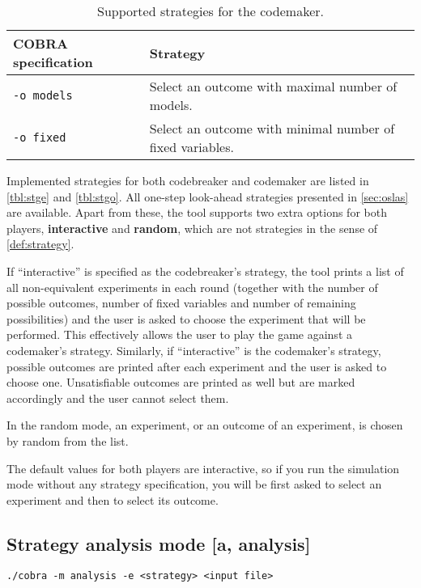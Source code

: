 \begin{table}[h]
\begin{center}
\begin{tabular}{|l|p{7cm}|} \hline
COBRA specification & Strategy \\\hline
 \texttt{-o models} & Select an outcome with maximal number of models. \\
\texttt{-o fixed} & Select an outcome with minimal number of fixed variables. \\\hline
\end{tabular}
\caption{Supported strategies for the codemaker.} \label{tbl:stgo}
\end{center}
\end{table}

Implemented strategies for both codebreaker and codemaker
  are listed in \autoref{tbl:stge} and \autoref{tbl:stgo}.
All one-step look-ahead strategies presented in \autoref{sec:oslas}
  are available.
Apart from these, the tool supports two extra options for both players,
  \textbf{interactive} and \textbf{random},
  which are not strategies in the sense of \autoref{def:strategy}.

If ``interactive'' is specified as the codebreaker's strategy,
  the tool prints a list of all non-equivalent experiments in each round
  (together with the number of possible outcomes, number of fixed variables
  and number of remaining possibilities) and the user is asked
  to choose the experiment that will be performed.
This effectively allows the user to play the game against a codemaker's strategy.
Similarly, if ``interactive'' is the codemaker's strategy, possible outcomes
  are printed after each experiment and the user is asked to choose one.
Unsatisfiable outcomes are printed as well but are marked accordingly
  and the user cannot select them.

In the random mode, an experiment, or an outcome of an experiment, is
  chosen by random from the list.

The default values for both players are interactive,
  so if you run the simulation mode without any strategy specification,
  you will be first asked to select an experiment and then to select its outcome.

\subsection{Strategy analysis mode [a, analysis]}

\centerline{\texttt{./cobra -m analysis -e <strategy> <input file> }}

